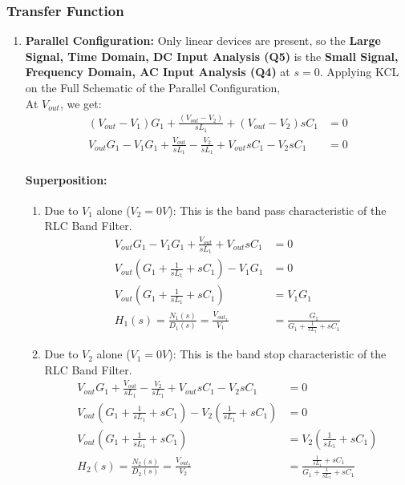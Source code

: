 \subsubsection{Transfer Function}
\begin{enumerate}
  \item \textbf{Parallel Configuration:}
    Only linear devices are present, so the \textbf{Large Signal, Time
    Domain, DC Input Analysis (Q5)} is the \textbf{Small Signal, Frequency
    Domain, AC Input Analysis (Q4)} at \(s = 0\). Applying KCL on the
    Full Schematic of the Parallel Configuration, \\
    At \(V_{out}\), we get:
    \begin{align*}
      (V_{out} - V_{1}){G_1} + \frac{(V_{out} - V_{2})}{sL_1} + (V_{out} - V_{2}){sC_1} &= 0 \\
      V_{out}G_1 - V_{1}G_1 + \frac{V_{out}}{sL_1} - \frac{V_{2}}{sL_1} + V_{out}sC_1 - V_{2}sC_1 &= 0
    \end{align*}
    \paragraph{Superposition:}
      \begin{enumerate}
        \item Due to \(V_{1}\) alone (\(V_{2} = 0V\)):
          This is the band pass characteristic of the RLC Band Filter.
          \begin{align*}
            V_{out}G_1 - V_{1}G_1 + \frac{V_{out}}{sL_1} + V_{out}sC_1 &= 0 \\
            V_{out}(G_1 + \frac{1}{sL_1} + sC_1) - V_{1}G_1 &= 0 \\
            V_{out}(G_1 + \frac{1}{sL_1} + sC_1) &= V_{1}G_1 \\
            H_1(s) = \frac{N_1(s)}{D_1(s)} = \frac{V_{out_1}}{V_{1}} &= \frac{G_1}{G_1 + \frac{1}{sL_1} + sC_1}
          \end{align*}
        \item Due to \(V_{2}\) alone (\(V_{1} = 0V\)):
          This is the band stop characteristic of the RLC Band Filter.
          \begin{align*}
            V_{out}G_1 + \frac{V_{out}}{sL_1} - \frac{V_{2}}{sL_1} + V_{out}sC_1 - V_{2}sC_1 &= 0 \\
            V_{out}(G_1 + \frac{1}{sL_1} + sC_1) - V_{2}(\frac{1}{sL_1} + sC_1) &= 0 \\
            V_{out}(G_1 + \frac{1}{sL_1} + sC_1) &= V_{2}(\frac{1}{sL_1} + sC_1) \\
            H_2(s) = \frac{N_2(s)}{D_2(s)} = \frac{V_{out_2}}{V_{2}} &= \frac{\frac{1}{sL_1} + sC_1}{G_1 + \frac{1}{sL_1} + sC_1}
          \end{align*}
      \end{enumerate}

\end{enumerate}
